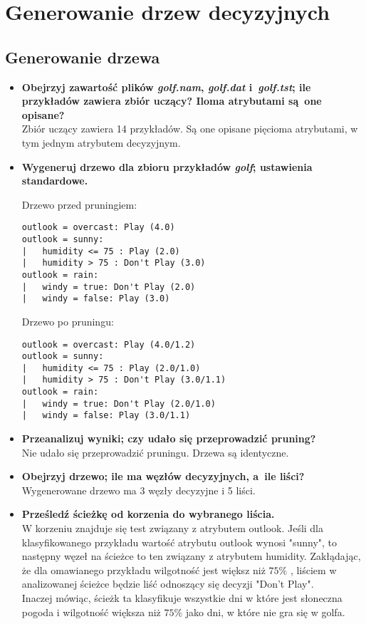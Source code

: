 
\section{Generowanie drzew decyzyjnych}

\subsection{Generowanie drzewa}

\begin{itemize}
\item \textbf{Obejrzyj zawartość plików \emph{golf.nam}, \emph{golf.dat} i~\emph{golf.tst}; ile przykładów zawiera zbiór uczący? Iloma atrybutami są~one opisane?}
	\\Zbiór uczący zawiera 14 przykładów. Są one opisane pięcioma atrybutami, w tym jednym atrybutem decyzyjnym.

\item \textbf{Wygeneruj drzewo dla zbioru przykładów \emph{golf}; ustawienia standardowe.}

Drzewo przed pruningiem:	 
	\begin{verbatim}
outlook = overcast: Play (4.0)
outlook = sunny:
|   humidity <= 75 : Play (2.0)
|   humidity > 75 : Don't Play (3.0)
outlook = rain:
|   windy = true: Don't Play (2.0)
|   windy = false: Play (3.0)
	\end{verbatim}
	
Drzewo po pruningu:
	\begin{verbatim}
outlook = overcast: Play (4.0/1.2)
outlook = sunny:
|   humidity <= 75 : Play (2.0/1.0)
|   humidity > 75 : Don't Play (3.0/1.1)
outlook = rain:
|   windy = true: Don't Play (2.0/1.0)
|   windy = false: Play (3.0/1.1)
	\end{verbatim}





\item \textbf{Przeanalizuj wyniki; czy udało się przeprowadzić pruning?}
	\\Nie udało się przeprowadzić pruningu. Drzewa są identyczne.

\item \textbf{Obejrzyj drzewo; ile ma węzłów decyzyjnych, a~ile liści?}
	\\Wygenerowane drzewo ma 3 węzły decyzyjne i 5 liści.

\item \textbf{ Prześledź ścieżkę od korzenia do wybranego liścia.}
		\\W korzeniu znajduje się test związany z atrybutem outlook. Jeśli dla klasyfikowanego przykładu wartość atrybutu outlook wynosi "sunny", to następny węzeł na ścieżce to ten związany z atrybutem humidity. Zakłądając, że dla omawianego przykładu wilgotność jest większ niż $ 75\% $ , liściem w analizowanej ścieżce będzie liść odnoszący się decyzji "Don't Play".
		\\Inaczej mówiąc, ścieżk ta klasyfikuje wszystkie dni w które jest słoneczna pogoda i wilgotność większa niż $ 75\% $ jako dni, w które nie gra się w golfa.
		

\end{itemize}
